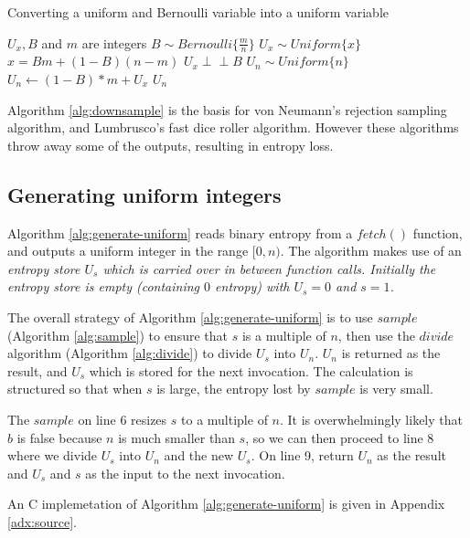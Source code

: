 \documentclass[12pt]{article}
\newcommand{\indep}{\perp\!\!\!\perp}
\begin{document}

\begin{algorithm}
\caption{Converting a uniform and Bernoulli variable into a uniform variable}
\label{alg:expand}
\begin{algorithmic}[1]
    \Require $U_{x}, B$ and $m$ are integers 
    \Require $B \sim Bernoulli\{\frac{m}{n}\}$
    \Require $U_{x} \sim Uniform\{x\}$
    \Require $x = Bm + (1-B)(n-m)$
    \Require $U_x \indep B$
    \Ensure $U_{n} \sim Uniform\{n\}$
    \State $U_n \gets (1-B)*m + U_x$
    \State \Return $U_n$
\EndProcedure
\end{algorithmic}
\end{algorithm}


Algorithm \ref{alg:downsample} is the basis for von Neumann's rejection sampling algorithm, and Lumbrusco's fast dice roller algorithm. However these algorithms throw away some of the outputs, resulting in entropy loss.

\subsection{Generating uniform integers}

Algorithm \ref{alg:generate-uniform} reads binary entropy from a $fetch()$ function, and outputs a uniform integer in the range $[0,n)$. The algorithm makes use of an \em entropy store \em $U_s$ which is carried over in between function calls. Initially the entropy store is empty (containing $0$ entropy) with $U_s = 0$ and $s=1$.

The overall strategy of Algorithm \ref{alg:generate-uniform} is to use $sample$ (Algorithm \ref{alg:sample}) to ensure that $s$ is a multiple of $n$, then use the $divide$ algorithm (Algorithm \ref{alg:divide}) to divide $U_s$ into $U_n$. $U_n$ is returned as the result, and $U_s$ which is stored for the next invocation. The calculation is structured so that when $s$ is large, the entropy lost by $sample$ is very small.

The $sample$ on line 6 resizes $s$ to a multiple of $n$. It is overwhelmingly likely that $b$ is false because $n$ is much smaller than $s$, so we can then proceed to line 8 where we divide $U_s$ into $U_n$ and the new $U_s$. On line 9, return $U_n$ as the result and $U_s$ and $s$ as the input to the next invocation.

An C implemetation of Algorithm \ref{alg:generate-uniform} is given in Appendix \ref{adx:source}.
\end{document}
